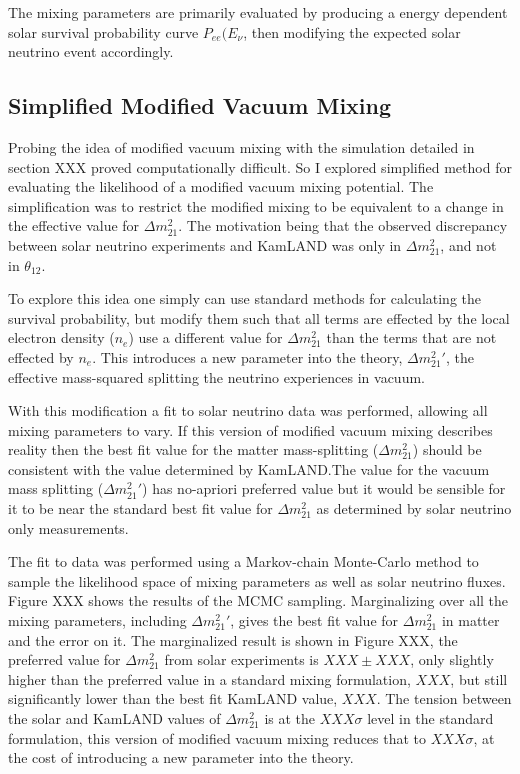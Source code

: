 The mixing parameters are primarily evaluated by producing a energy dependent
solar survival probability curve $P_{ee}(E_{\nu}$, then modifying the expected
solar neutrino event accordingly. %


\subsection{Simplified Modified Vacuum Mixing}
Probing the idea of modified vacuum mixing with the simulation detailed in
section XXX proved computationally difficult.
So I explored simplified method for evaluating the likelihood of a modified
vacuum mixing potential. The simplification was to restrict the modified mixing
to be equivalent to a change in the effective value for $\Delta m^{2}_{21}$.
The motivation being that the observed discrepancy between solar neutrino
experiments and KamLAND was only in $\Delta m^{2}_{21}$, and not in $\theta_{12}$.

To explore this idea one simply can use standard methods for calculating the
survival probability, but modify them such that all terms are effected by the
local electron density ($n_{e}$) use a different value for $\Delta m^{2}_{21}$ than the
terms that are not effected by $n_{e}$.
This introduces a new parameter into the theory, $\Delta m^{2}_{21}\prime$, the
effective mass-squared splitting the neutrino experiences in vacuum.

With this modification a fit to solar neutrino data was performed, allowing
all mixing parameters to vary. If this version of modified vacuum mixing describes
reality then the best fit value for the matter mass-splitting ($\Delta m^{2}_{21}$) should be
consistent with the value determined by KamLAND.\@ The value for the vacuum mass
splitting ($\Delta m^{2}_{21}\prime$) has no-apriori preferred value but it would
be sensible for it to be near the standard best fit value for $\Delta m^{2}_{21}$
as determined by solar neutrino only measurements.

The fit to data was performed using a Markov-chain Monte-Carlo method to sample
the likelihood space of mixing parameters as well as solar neutrino fluxes.
Figure XXX shows the results of the MCMC sampling. Marginalizing over all
the mixing parameters, including $\Delta m^{2}_{21}\prime$, gives the best fit
value for $\Delta m^{2}_{21}$ in matter and the error on it.
The marginalized result is shown in Figure XXX, the preferred value
for $\Delta m^{2}_{21}$ from solar experiments is $XXX\pm XXX$, only slightly higher than
the preferred value in a standard mixing formulation, $XXX$, but still significantly
lower than the best fit KamLAND value, $XXX$.
The tension between the solar and KamLAND values of $\Delta m^{2}_{21}$ is at
the $XXX\sigma$ level in the standard formulation, this version of modified
vacuum mixing reduces that to $XXX\sigma$, at the cost of introducing a new
parameter into the theory.

